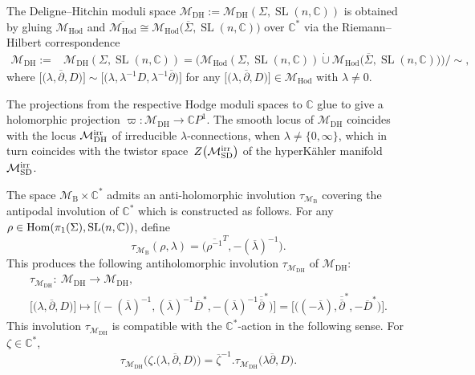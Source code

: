 \documentclass[pdftex]{sigma}
\numberwithin{equation}{section}
\theoremstyle{definition}
\newcommand\C{{\mathbb C}}
\begin{document}
The Deligne--Hitchin moduli space $\mathcal{M}_{\mathrm{DH}} := \mathcal{M}_{\mathrm{DH}}(\Sigma, \operatorname{SL}(n,\C))$ is obtained by gluing $\mathcal{M}_{\mathrm{Hod}}$
and $\overline{\mathcal{M}_{\mathrm{Hod}}} \cong \mathcal{M}_{\mathrm{Hod}}\bigl(\overline{\Sigma}, \operatorname{SL}(n,\C)\bigr)$ over $\C^*$ via the
Riemann--Hilbert correspondence
\begin{align*}
\mathcal{M}_{\mathrm{DH}} := & \mathcal{M}_{\mathrm{DH}}(\Sigma, \operatorname{SL}(n,\C))
 = \bigl(\mathcal{M}_{\mathrm{Hod}}(\Sigma,\operatorname{SL}(n,\C)) \dot\cup
\mathcal{M}_{\mathrm{Hod}}\bigl(\overline{\Sigma}, \operatorname{SL}(n,\C)\bigr)\bigr)/{\sim},
\end{align*}
where
$%
\big[\bigl(\lambda, \overline{\partial}, D\bigr)\big] \sim \big[\bigl(\lambda, \lambda^{-1} D,
\lambda^{-1}\overline{\partial}\bigr)\big]
$
for any $\big[\bigl(\lambda, \overline{\partial}, D\bigr)\big] \in \mathcal{M}_{\mathrm{Hod}}$ with $\lambda \neq 0$.

The projections from the respective Hodge moduli spaces to $\C$ glue to give a holomorphic
projection
$\varpi\colon \mathcal{M}_{\mathrm{DH}} \longrightarrow \mathbb CP^1 $.
The smooth locus of $\mathcal{M}_{\mathrm{DH}}$ coincides with the locus
$\mathcal{M}_{\mathrm{DH}}^{\rm irr}$ of irreducible $\lambda$-connections, when $\lambda \not= \{0, \infty\}$, which in turn coincides with the twistor
space~$Z\bigl(\mathcal{M}_{\mathrm{SD}}^{\rm irr}\bigr)$ of the hyperK\"ahler manifold $\mathcal{M}_{\mathrm{SD}}^{\rm irr}$.

The space $\mathcal{M}_{\mathrm{B}}\times\C^*$ admits an anti-holomorphic involution $\tau_{\mathcal{M}_{\mathrm{B}}}$ covering the
antipodal involution  of $\C^*$ which is
constructed as follows. For any $\rho \in {\rm Hom}(\pi_1(\Sigma), \operatorname{SL}(n,\C))$, define
\[
\tau_{\mathcal{M}_{\mathrm{B}}}(\rho, \lambda) = \bigl(\overline{\rho^{-1}}^T, -(\overline{\lambda})^{-1}\bigr).
\]
This produces the following antiholomorphic involution $\tau_{\mathcal{M}_{\mathrm{DH}}}$ of $\mathcal{M}_{\mathrm{DH}}$:
\begin{gather*}
\tau_{\mathcal{M}_{\mathrm{DH}}} \colon\ \mathcal{M}_{\mathrm{DH}} \longrightarrow \mathcal{M}_{\mathrm{DH}},\\
 \big[\bigl(\lambda, \overline{\partial}, D\bigr)\big] \longmapsto \big[\bigl(-(\overline{\lambda})^{-1}, (\overline{\lambda})^{-1}\overline{D}^*,
 -(\overline{\lambda})^{-1}\overline{\overline\partial}^*\bigr)\big]
 = \big[\bigl((-\overline\lambda), \overline{\overline\partial}^*, -\overline{D}^*\bigr)\big].
\end{gather*}
This involution $\tau_{\mathcal{M}_{\mathrm{DH}}}$ is compatible with the $\C^*$-action in the following sense.
For $\zeta \in \C^*$,
\[%
\tau_{\mathcal{M}_{\mathrm{DH}}}\bigl(\zeta.\bigl(\lambda, \overline\partial, D\bigr)\bigr) =
\overline \zeta^{-1}.\tau_{\mathcal{M}_{\mathrm{DH}}}\bigl(\lambda \overline\partial, D\bigr).
\]
\end{document}
